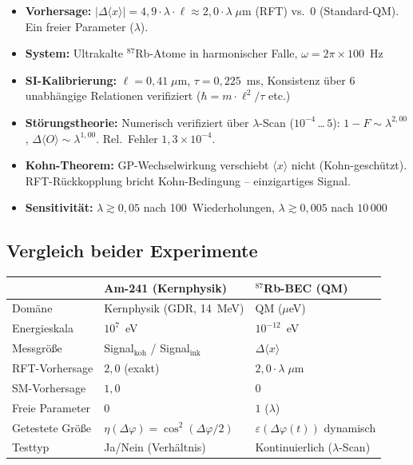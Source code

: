 \documentclass[a4paper,11pt]{article}
\begin{document}
	\begin{itemize}
		\item \textbf{Vorhersage:}
		$|\Delta\langle x\rangle|
		= 4{,}9 \cdot \lambda \cdot \ell
		\approx 2{,}0 \cdot \lambda\;\mu$m (RFT)
		vs.\ $0$ (Standard-QM). Ein freier Parameter
		($\lambda$).
		\item \textbf{System:} Ultrakalte ${}^{87}$Rb-Atome
		in harmonischer Falle,
		$\omega = 2\pi \times 100$~Hz
		\item \textbf{SI-Kalibrierung:}
		$\ell = 0{,}41\;\mu$m,
		$\tau = 0{,}225$~ms, Konsistenz \"uber 6
		unabh\"angige Relationen verifiziert
		($\hbar = m \cdot \ell^2/\tau$ etc.)
		\item \textbf{St\"orungstheorie:} Numerisch
		verifiziert \"uber $\lambda$-Scan
		($10^{-4}$\,\ldots\,$5$):
		$1 - F \sim \lambda^{2{,}00}$,
		$\Delta\langle O\rangle \sim \lambda^{1{,}00}$.
		Rel.\ Fehler $1{,}3 \times 10^{-4}$.
		\item \textbf{Kohn-Theorem:}
		GP-Wechselwirkung verschiebt $\langle x\rangle$
		nicht (Kohn-gesch\"utzt). RFT-R\"uckkopplung bricht
		Kohn-Bedingung -- einzigartiges Signal.
		\item \textbf{Sensitivit\"at:}
		$\lambda \gtrsim 0{,}05$ nach 100~Wiederholungen,
		$\lambda \gtrsim 0{,}005$ nach $10\,000$
	\end{itemize}
	
	\subsection{Vergleich beider Experimente}
	
	\begin{center}
		\small
		\begin{tabular}{lll}
			\hline
			& \textbf{Am-241 (Kernphysik)}
			& \textbf{${}^{87}$Rb-BEC (QM)} \\
			\hline
			Dom\"ane & Kernphysik (GDR, 14~MeV)
			& QM ($\mu$eV) \\
			Energieskala & $10^7$~eV & $10^{-12}$~eV \\
			Messgr\"o\ss{}e
			& Signal$_{\mathrm{koh}}$ /
			Signal$_{\mathrm{ink}}$
			& $\Delta\langle x\rangle$ \\
			RFT-Vorhersage & $2{,}0$ (exakt)
			& $2{,}0 \cdot \lambda\;\mu$m \\
			SM-Vorhersage & $1{,}0$ & $0$ \\
			Freie Parameter & $0$ & $1$ ($\lambda$) \\
			Getestete Gr\"o\ss{}e
			& $\eta(\Delta\varphi)
			= \cos^2(\Delta\varphi/2)$
			& $\varepsilon(\Delta\varphi(t))$ dynamisch \\
			Testtyp & Ja/Nein (Verh\"altnis)
			& Kontinuierlich ($\lambda$-Scan) \\
			\hline
		\end{tabular}
	\end{center}
	
\end{document}
